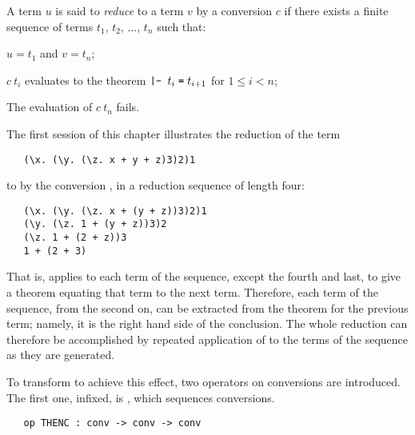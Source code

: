 A term $u$ is said to {\it reduce\/} to a term $v$ by a conversion $c$ if
there exists a
finite sequence of terms $t_1$, $t_2$, $\ldots$, $t_n$ such that:
\begin{myenumerate}
\item $u = t_1$ and $v = t_n$;
\item $c\ t_i$ evaluates to the theorem
$\ml{|- }t_i\;\ml{=}\;t_{i+1}$ for $1\leq i < n$;
\item The evaluation of $c\ t_n$ fails.
\end{myenumerate}

\noindent The first session of this chapter illustrates the reduction of
the term

\begin{hol}
\begin{verbatim}
   (\x. (\y. (\z. x + y + z)3)2)1
\end{verbatim}
\end{hol}

\noindent to  by the
conversion , in a reduction sequence of length four:

\begin{hol}
\begin{verbatim}
   (\x. (\y. (\z. x + (y + z))3)2)1
   (\y. (\z. 1 + (y + z))3)2
   (\z. 1 + (2 + z))3
   1 + (2 + 3)
\end{verbatim}
\end{hol}

\noindent That is,  applies to each term of the sequence,
except the fourth and last, to give a theorem equating that term to
the next term. Therefore, each term of the sequence, from the second
on, can be extracted from the theorem for the previous term; namely,
it is the right hand side of the conclusion.  The whole reduction can
therefore be accomplished by repeated application of 
to the terms of the sequence as they are generated.

 To transform  to
achieve this effect, two operators on
conversions are introduced.  The
first one, infixed, is , which sequences conversions.

\begin{holboxed}
\begin{verbatim}
   op THENC : conv -> conv -> conv
\end{verbatim}
\end{holboxed}

